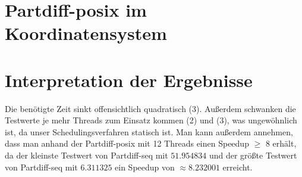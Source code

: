\documentclass[a4paper,11pt]{scrartcl}
\begin{document}
\section{Partdiff-posix im Koordinatensystem}
\section{Interpretation der Ergebnisse}
Die benötigte Zeit sinkt offensichtlich quadratisch (3). Außerdem schwanken die Testwerte
je mehr Threads zum Einsatz kommen (2) und (3), was ungewöhnlich ist, da unser Schedulingsverfahren statisch ist. Man kann außerdem annehmen, dass man anhand der Partdiff-posix mit 12 Threads einen Speedup $\geq$ 8 erhält, da der kleinste Testwert von Partdiff-seq
mit $51.954834$ und der größte Testwert von Partdiff-seq mit $6.311325$ ein Speedup von $\approx 8.232001$ erreicht.
\end{document}
